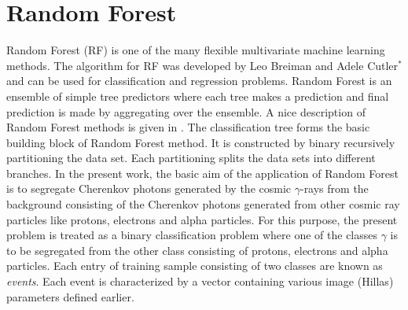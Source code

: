 \documentclass[preprint,12pt]{elsarticle}
\begin{document}
\section{Random Forest}
\label{rforest}

Random Forest (RF) is one of the many flexible multivariate machine learning methods. The algorithm for 
RF was developed by Leo Breiman and Adele Cutler$^*$  
and can be used  for classification and regression problems. Random Forest is an ensemble of simple tree predictors where each tree 
makes a prediction and final prediction is made by aggregating over the ensemble. A nice description of Random Forest methods is given in 
\cite{mradul1,magicRF}. The classification tree forms the basic building block of Random Forest method. It is 
constructed by binary recursively partitioning the data set. Each partitioning splits the data sets into different branches. 
In the present work, the basic aim of the application of Random Forest is to segregate Cherenkov photons generated by the 
cosmic $\gamma$-rays from the background consisting of the Cherenkov photons generated from other cosmic ray particles like 
protons, electrons and alpha particles. For this purpose, the present problem is treated as a binary classification problem 
where one of the classes $\gamma$ is to be segregated from the other class consisting of protons, electrons and alpha particles. 
Each entry of training sample consisting of two classes are known as \textit{events}. Each event is characterized by a vector 
containing various image (Hillas) parameters defined earlier.
\end{document}
